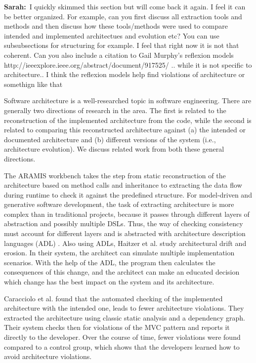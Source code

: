 \documentclass[sigplan, anonymous, review]{acmart}
\newcommand{\sn}[1]{{\color{blue}\textbf{Sarah:}~#1}}
\begin{document}
\sn{I quickly skimmed this section but will come back it again. I feel it can be better organized. For example, can you first discuss all extraction tools and methods and then discuss how these tools/methods were used to compare intended and implemented architectues and evolution etc? You can use subsubsections for structuring for example. I feel that right  now it is not that coherent. Can you also include a citation to Gail Murphy's reflexion models http://ieeexplore.ieee.org/abstract/document/917525/ .. while it is not specific to architecture.. I think the reflexion models help find violations of architecture or somethign like that}

Software architecture is a well-researched topic in software engineering.
There are generally two directions of research in the area.
The first is related to the reconstruction of the implemented architecture from the code, while the second is related to comparing this reconstructed architecture against (a) the intended or documented architecture and (b) different versions of the system (i.e., architecture evolution).
We discuss related work from both these general directions.

The ARAMIS workbench \cite{Aramis} takes the step from static reconstruction of the architecture based on method calls and inheritance to extracting the data flow during runtime to check it against the predefined structure. 
For model-driven and generative software development, the task of extracting architecture is more complex than in traditional projects, because it passes through different layers of abstraction and possibly multiple DSLs. 
Thus, the way of checking consistency must account for different layers and is abstracted with architecture description languages (ADL) \cite{ArcCons,Arc-MDSE}. 
Also using ADLs, Haitzer et al. \cite{Arc-Decision} study architectural drift and erosion. In their system, the architect can simulate multiple implementation scenarios. With the help of the ADL, the program then calculates the consequences of this change, and the architect can make an educated decision which change has the best impact on the system and its architecture. 

Caracciolo et al. \cite{ArcConf} found that the automated checking of the implemented architecture with the intended one, leads to fewer architecture violations. They extracted the architecture using classic static analysis and a dependency graph. Their system checks then for violations of the MVC pattern and reports it directly to the developer. Over the course of time, fewer violations were found compared to a control group, which shows that the developers learned how to avoid architecture violations.
\end{document}
